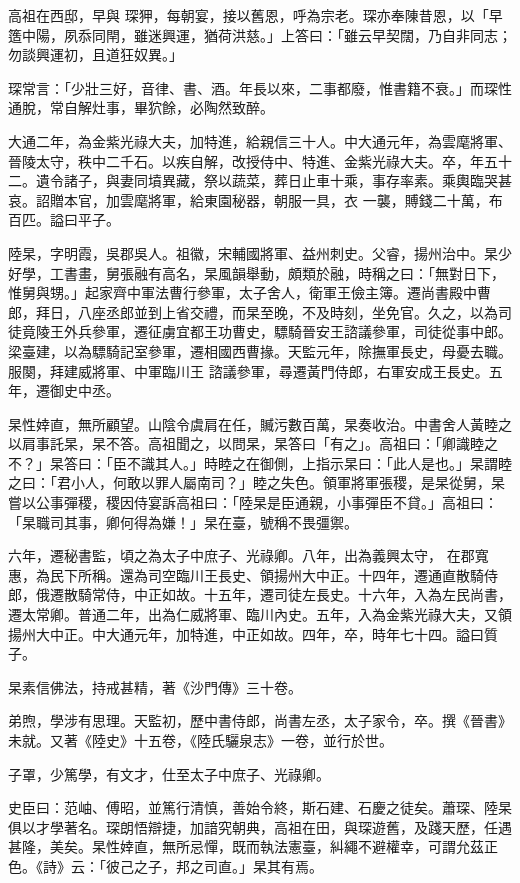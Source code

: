 \begin{pinyinscope}
 高祖在西邸，早與
 琛狎，每朝宴，接以舊恩，呼為宗老。琛亦奉陳昔恩，以「早簉中陽，夙忝同閈，雖迷興運，猶荷洪慈。」上答曰：「雖云早契闊，乃自非同志；勿談興運初，且道狂奴異。」



 琛常言：「少壯三好，音律、書、酒。年長以來，二事都廢，惟書籍不衰。」而琛性通脫，常自解灶事，畢狖餘，必陶然致醉。



 大通二年，為金紫光祿大夫，加特進，給親信三十人。中大通元年，為雲麾將軍、晉陵太守，秩中二千石。以疾自解，改授侍中、特進、金紫光祿大夫。卒，年五十二。遺令諸子，與妻同墳異藏，祭以蔬菜，葬日止車十乘，事存率素。乘輿臨哭甚哀。詔贈本官，加雲麾將軍，給東園秘器，朝服一具，衣
 一襲，賻錢二十萬，布百匹。謚曰平子。



 陸杲，字明霞，吳郡吳人。祖徽，宋輔國將軍、益州刺史。父睿，揚州治中。杲少好學，工書畫，舅張融有高名，杲風韻舉動，頗類於融，時稱之曰：「無對日下，惟舅與甥。」起家齊中軍法曹行參軍，太子舍人，衛軍王儉主簿。遷尚書殿中曹郎，拜日，八座丞郎並到上省交禮，而杲至晚，不及時刻，坐免官。久之，以為司徒竟陵王外兵參軍，遷征虜宜都王功曹史，驃騎晉安王諮議參軍，司徒從事中郎。梁臺建，以為驃騎記室參軍，遷相國西曹掾。天監元年，除撫軍長史，母憂去職。服闋，拜建威將軍、中軍臨川王
 諮議參軍，尋遷黃門侍郎，右軍安成王長史。五年，遷御史中丞。



 杲性婞直，無所顧望。山陰令虞肩在任，贓污數百萬，杲奏收治。中書舍人黃睦之以肩事託杲，杲不答。高祖聞之，以問杲，杲答曰「有之」。高祖曰：「卿識睦之不？」杲答曰：「臣不識其人。」時睦之在御側，上指示杲曰：「此人是也。」杲謂睦之曰：「君小人，何敢以罪人屬南司？」睦之失色。領軍將軍張稷，是杲從舅，杲嘗以公事彈稷，稷因侍宴訴高祖曰：「陸杲是臣通親，小事彈臣不貸。」高祖曰：「杲職司其事，卿何得為嫌！」杲在臺，號稱不畏彊禦。



 六年，遷秘書監，頃之為太子中庶子、光祿卿。八年，出為義興太守，
 在郡寬惠，為民下所稱。還為司空臨川王長史、領揚州大中正。十四年，遷通直散騎侍郎，俄遷散騎常侍，中正如故。十五年，遷司徒左長史。十六年，入為左民尚書，遷太常卿。普通二年，出為仁威將軍、臨川內史。五年，入為金紫光祿大夫，又領揚州大中正。中大通元年，加特進，中正如故。四年，卒，時年七十四。謚曰質子。



 杲素信佛法，持戒甚精，著《沙門傳》三十卷。



 弟煦，學涉有思理。天監初，歷中書侍郎，尚書左丞，太子家令，卒。撰《晉書》未就。又著《陸史》十五卷，《陸氏驪泉志》一卷，並行於世。



 子罩，少篤學，有文才，仕至太子中庶子、光祿卿。



 史臣曰：范岫、傅昭，並篤行清慎，善始令終，斯石建、石慶之徒矣。蕭琛、陸杲俱以才學著名。琛朗悟辯捷，加諳究朝典，高祖在田，與琛遊舊，及踐天歷，任遇甚隆，美矣。杲性婞直，無所忌憚，既而執法憲臺，糾繩不避權幸，可謂允茲正色。《詩》云：「彼己之子，邦之司直。」杲其有焉。



\end{pinyinscope}